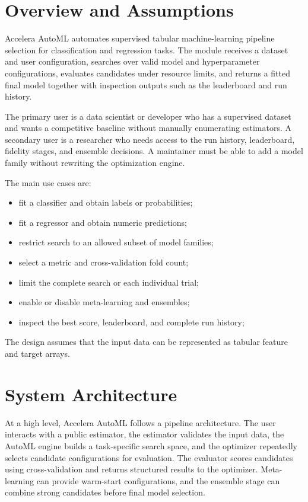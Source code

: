 \documentclass[12pt,a4paper,oneside]{report}
\newcommand{\systemname}{Accelera AutoML}
\begin{document}
\section{Overview and Assumptions}

\systemname{} automates supervised tabular machine-learning pipeline selection
for classification and regression tasks. The module receives a dataset and user
configuration, searches over valid model and hyperparameter configurations,
evaluates candidates under resource limits, and returns a fitted final model
together with inspection outputs such as the leaderboard and run history.

\medskip

\noindent The primary user is a data scientist or developer who has a supervised
dataset and wants a competitive baseline without manually enumerating
estimators. A secondary user is a researcher who needs access to the run
history, leaderboard, fidelity stages, and ensemble decisions. A maintainer must
be able to add a model family without rewriting the optimization engine.

\medskip

\noindent The main use cases are:

\begin{itemize}[leftmargin=*]
  \item fit a classifier and obtain labels or probabilities;
  \item fit a regressor and obtain numeric predictions;
  \item restrict search to an allowed subset of model families;
  \item select a metric and cross-validation fold count;
  \item limit the complete search or each individual trial;
  \item enable or disable meta-learning and ensembles;
  \item inspect the best score, leaderboard, and complete run history;
\end{itemize}

\noindent The design assumes that the input data can be represented as tabular
feature and target arrays.

\section{System Architecture}

At a high level, \systemname{} follows a pipeline architecture. The user
interacts with a public estimator, the estimator validates the input data, the
AutoML engine builds a task-specific search space, and the optimizer repeatedly
selects candidate configurations for evaluation. The evaluator scores
candidates using cross-validation and returns structured results to the
optimizer. Meta-learning can provide warm-start configurations, and the ensemble
stage can combine strong candidates before final model selection.
\end{document}
